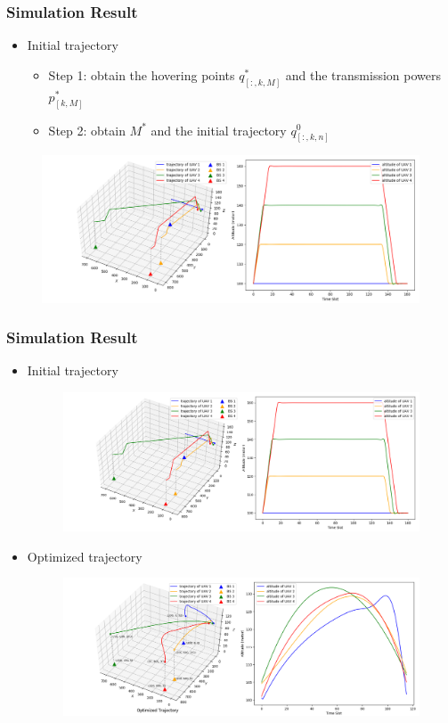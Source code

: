 \documentclass[11.5pt]{beamer}
\begin{document}
\begin{frame}
	\frametitle{Simulation Result}
	\begin{itemize}
		\item Initial trajectory
		\begin{itemize}
			\item Step 1: obtain the hovering points $q_{[:, k, M]}^*$ and the transmission powers $p_{[k, M]}^*$
			\item Step 2: obtain $M^*$ and the initial trajectory $q_{[:, k, n]}^0$
		\end{itemize}
	\end{itemize}
	
	\begin{figure}
		\centering
		\includegraphics[width=.9\linewidth]{init_trajectory.png}
	\end{figure}
\end{frame}
\begin{frame}
	\frametitle{Simulation Result}
	\begin{itemize}\itemsep-0.5em
		\item Initial trajectory
		\begin{figure}
			\includegraphics[width=.8\linewidth]{init_trajectory.png}
		\end{figure}
		\item Optimized trajectory
		\begin{figure}
			\includegraphics[width=.8\linewidth]{opt_trajectory.png}
		\end{figure}
	\end{itemize}
\end{frame}
\end{document}
